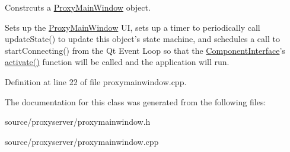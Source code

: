 Constrcuts a \hyperlink{class_proxy_main_window}{Proxy\-Main\-Window} object. 

Sets up the \hyperlink{class_proxy_main_window}{Proxy\-Main\-Window} U\-I, sets up a timer to periodically call update\-State() to update this object's state machine, and schedules a call to start\-Connecting() from the Qt Event Loop so that the \hyperlink{class_component_interface}{Component\-Interface}'s \hyperlink{class_component_interface_aa5114fa432d4102e697b808c986a59bd}{activate()} function will be called and the application will run. 

Definition at line 22 of file proxymainwindow.\-cpp.



The documentation for this class was generated from the following files\-:\begin{DoxyCompactItemize}
\item 
source/proxyserver/proxymainwindow.\-h\item 
source/proxyserver/proxymainwindow.\-cpp\end{DoxyCompactItemize}
